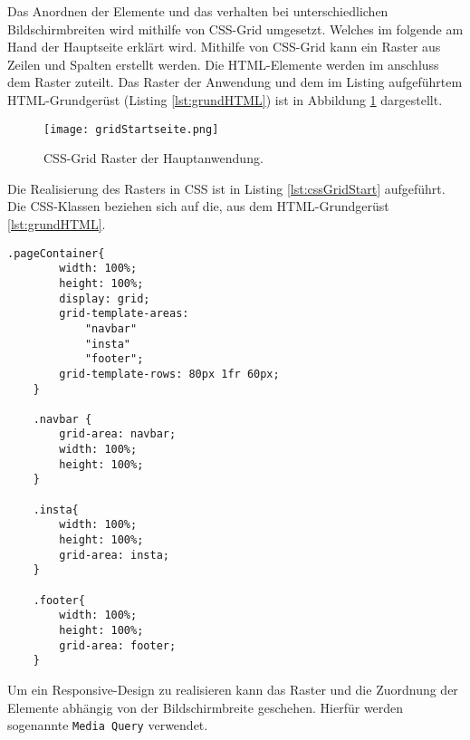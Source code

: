 Das Anordnen der Elemente und das verhalten bei unterschiedlichen Bildschirmbreiten wird mithilfe von CSS-Grid umgesetzt. Welches im folgende am Hand der Hauptseite erklärt wird. 
Mithilfe von CSS-Grid kann ein Raster aus Zeilen und Spalten erstellt werden. Die HTML-Elemente werden im anschluss dem Raster zuteilt. 
Das Raster der Anwendung und dem im Listing aufgeführtem HTML-Grundgerüst (Listing \ref{lst:grundHTML}) ist in Abbildung \ref{img:gridRaster} dargestellt.

\begin{figure}[!htb]
    \centering
    \texttt{[image: gridStartseite.png]}
    \caption{CSS-Grid Raster der Hauptanwendung.}
    \label{img:gridRaster}
\end{figure}

Die Realisierung des Rasters in CSS ist in Listing \ref{lst:cssGridStart} aufgeführt. Die CSS-Klassen beziehen sich auf die, aus dem HTML-Grundgerüst \ref{lst:grundHTML}.

\begin{lstlisting}[caption={Realisierung des Grid-Rasters in CSS}, label={lst:cssGridStart}, float=!htb]
    .pageContainer{
        width: 100%;
        height: 100%;
        display: grid;
        grid-template-areas:
            "navbar"
            "insta"
            "footer";
        grid-template-rows: 80px 1fr 60px;
    }

    .navbar {
        grid-area: navbar;
        width: 100%;
        height: 100%;
    }

    .insta{
        width: 100%;
        height: 100%;
        grid-area: insta;
    }

    .footer{
        width: 100%;
        height: 100%;
        grid-area: footer;
    }
\end{lstlisting}

Um ein Responsive-Design zu realisieren kann das Raster und die Zuordnung der Elemente abhängig von der Bildschirmbreite geschehen. Hierfür werden sogenannte \texttt{Media Query} verwendet. 

